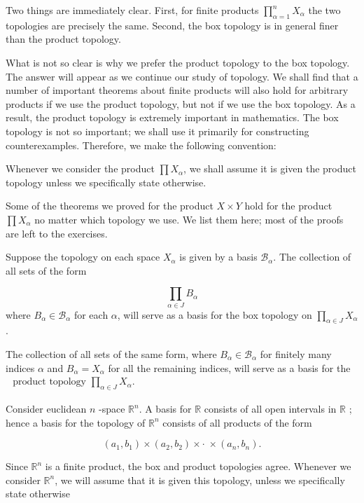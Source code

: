 Two things are immediately clear. First, for finite products \(\mathop{\prod }\limits_{{\alpha = 1}}^{n}X_{\alpha }\) the two topologies are precisely the same. Second, the box topology is in general finer than the product topology.

What is not so clear is why we prefer the product topology to the box topology. The answer will appear as we continue our study of topology. We shall find that a number of important theorems about finite products will also hold for arbitrary products if we use the product topology, but not if we use the box topology. As a result, the product topology is extremely important in mathematics. The box topology is not so important; we shall use it primarily for constructing counterexamples. Therefore, we make the following convention:

\begin{centeredblock}
 Whenever we consider the product \(\prod {X}_{\alpha }\), we shall assume it is given the product topology unless we specifically state otherwise.
\end{centeredblock}

Some of the theorems we proved for the product \(X \times Y\) hold for the product \(\prod {X}_{\alpha }\) no matter which topology we use. We list them here; most of the proofs are left to the exercises.

\begin{theorem}
\label{thm:\thetheorem}
 Suppose the topology on each space \(X_{\alpha }\) is given by a basis \(\mathcal{B}_{\alpha }\). The collection of all sets of the form

 \[
 \mathop{\prod }\limits_{{\alpha \in J}}B_{\alpha }
 \]
 where \(B_{\alpha } \in {\mathcal{B}}_{\alpha }\) for each \(\alpha\), will serve as a basis for the box topology on \(\mathop{\prod }\limits_{{\alpha \in J}}X_{\alpha }\).

 The collection of all sets of the same form, where \(B_{\alpha } \in {\mathcal{B}}_{\alpha }\) for finitely many indices \(\alpha\) and \(B_{\alpha } = X_{\alpha }\) for all the remaining indices, will serve as a basis for the \(\begin{matrix} \text{ product topology }\mathop{\prod }\limits_{{\alpha \in J}}X_{\alpha }. \end{matrix}\)
\end{theorem}

\begin{centeredblock}
\begin{example}
\label{ex:\thesection.\theexample}
 Consider euclidean \(n\) -space \(\mathbb{R}^{n}\). A basis for \(\mathbb{R}\) consists of all open intervals in \(\mathbb{R}\) ; hence a basis for the topology of \(\mathbb{R}^{n}\) consists of all products of the form

 \[
 ( {a_{1},b_{1}}) \times ( {a_{2},b_{2}}) \times \cdot \; \times ( {a_{n},b_{n}}).
 \]

 Since \(\mathbb{R}^{n}\) is a finite product, the box and product topologies agree. Whenever we consider \(\mathbb{R}^{n}\), we will assume that it is given this topology, unless we specifically state otherwise
\end{example}
\end{centeredblock}

